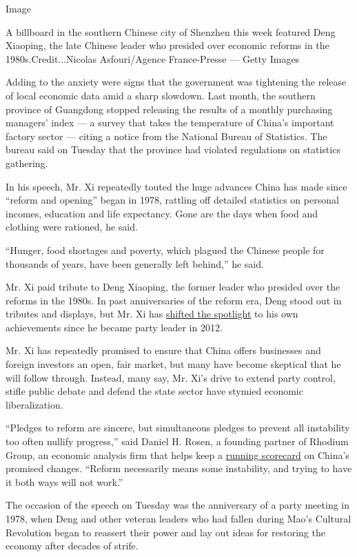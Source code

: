 Image

A billboard in the southern Chinese city of Shenzhen this week featured
Deng Xiaoping, the late Chinese leader who presided over economic
reforms in the 1980s.Credit...Nicolas Asfouri/Agence France-Presse ---
Getty Images

Adding to the anxiety were signs that the government was tightening the
release of local economic data amid a sharp slowdown. Last month, the
southern province of Guangdong stopped releasing the results of a
monthly purchasing managers' index --- a survey that takes the
temperature of China's important factory sector --- citing a notice from
the National Bureau of Statistics. The bureau said on Tuesday that the
province had violated regulations on statistics gathering.

In his speech, Mr. Xi repeatedly touted the huge advances China has made
since ``reform and opening'' began in 1978, rattling off detailed
statistics on personal incomes, education and life expectancy. Gone are
the days when food and clothing were rationed, he said.

``Hunger, food shortages and poverty, which plagued the Chinese people
for thousands of years, have been generally left behind,'' he said.

Mr. Xi paid tribute to Deng Xiaoping, the former leader who presided
over the reforms in the 1980s. In past anniversaries of the reform era,
Deng stood out in tributes and displays, but Mr. Xi has
\href{https://www.nytimes.com/2018/11/05/world/asia/china-xi-jinping-deng-xiaoping.html}{shifted
the spotlight} to his own achievements since he became party leader in
2012.

Mr. Xi has repeatedly promised to ensure that China offers businesses
and foreign investors an open, fair market, but many have become
skeptical that he will follow through. Instead, many say, Mr. Xi's drive
to extend party control, stifle public debate and defend the state
sector have stymied economic liberalization.

``Pledges to reform are sincere, but simultaneous pledges to prevent all
instability too often nullify progress,'' said Daniel H. Rosen, a
founding partner of Rhodium Group, an economic analysis firm that helps
keep a
\href{https://rhg.com/research/the-china-dashboard-tracking-chinas-economic-reforms/}{running
scorecard} on China's promised changes. ``Reform necessarily means some
instability, and trying to have it both ways will not work.''

The occasion of the speech on Tuesday was the anniversary of a party
meeting in 1978, when Deng and other veteran leaders who had fallen
during Mao's Cultural Revolution began to reassert their power and lay
out ideas for restoring the economy after decades of strife.

